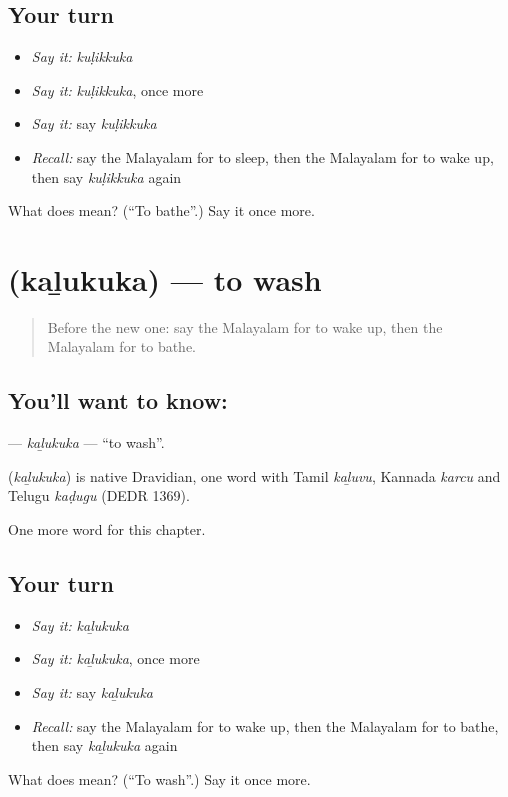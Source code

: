 \subsection*{Your turn}
\begin{itemize}
\raggedright
  \item \emph{Say it:} \emph{kuḷikkuka}
  \item \emph{Say it:} \emph{kuḷikkuka}, once more
  \item \emph{Say it:} say \emph{kuḷikkuka}
  \item \emph{Recall:} say the Malayalam for to sleep, then the Malayalam for to wake up, then say \emph{kuḷikkuka} again
\end{itemize}

\begin{tcolorbox}[breakable,colback=teal!4,colframe=teal!35!black,title={Before you move on}]
What does  mean? (\textquotedblleft{}To bathe\textquotedblright{}.) Say it once more.
\end{tcolorbox}
\section[\texorpdfstring{\ml{കഴുകുക} (kaḻukuka)}{കഴുകുക (kaḻukuka)}]{ (kaḻukuka) — to wash}

\label{lesson:ML-C171-kalukuka}



\begin{quote}
Before the new one: say the Malayalam for to wake up, then the Malayalam for to bathe.
\end{quote}

\subsection*{You'll want to know: }
\textbf{} — \emph{kaḻukuka} — \textquotedblleft{}to wash\textquotedblright{}.

\begin{cousinweb}
\textbf{} (\emph{kaḻukuka}) is native Dravidian, one word with Tamil \emph{kaḻuvu}, Kannada \emph{karcu} and Telugu \emph{kaḍugu} (DEDR 1369).
\end{cousinweb}

\begin{grammarlens}[title={What you've built}]
One more word for this chapter.
\end{grammarlens}

\subsection*{Your turn}
\begin{itemize}
\raggedright
  \item \emph{Say it:} \emph{kaḻukuka}
  \item \emph{Say it:} \emph{kaḻukuka}, once more
  \item \emph{Say it:} say \emph{kaḻukuka}
  \item \emph{Recall:} say the Malayalam for to wake up, then the Malayalam for to bathe, then say \emph{kaḻukuka} again
\end{itemize}

\begin{tcolorbox}[breakable,colback=teal!4,colframe=teal!35!black,title={Before you move on}]
What does  mean? (\textquotedblleft{}To wash\textquotedblright{}.) Say it once more.
\end{tcolorbox}
